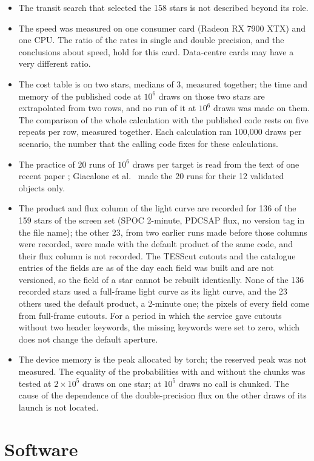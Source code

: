 \documentclass[11pt]{article}
\begin{document}
\begin{itemize}
\item The transit search that selected the 158 stars is not described beyond its role.
\item The speed was measured on one consumer card (Radeon RX 7900 XTX) and one CPU. The ratio of the rates in single and double precision, and the conclusions about speed, hold for this card. Data-centre cards may have a very different ratio.
\item The cost table is on two stars, medians of 3, measured together; the time and memory of the published code at $10^{6}$ draws on those two stars are extrapolated from two rows, and no run of it at $10^{6}$ draws was made on them. The comparison of the whole calculation with the published code rests on five repeats per row, measured together. Each calculation ran 100,000 draws per scenario, the number that the calling code fixes for these calculations.
\item The practice of 20 runs of $10^{6}$ draws per target is read from the text of one recent paper \cite{collier2026}; Giacalone et al.\ \cite{giacalone2021} made the 20 runs for their 12 validated objects only.
\item The product and flux column of the light curve are recorded for 136 of the 159 stars of the screen set (SPOC 2-minute, PDCSAP flux, no version tag in the file name); the other 23, from two earlier runs made before those columns were recorded, were made with the default product of the same code, and their flux column is not recorded. The TESScut cutouts and the catalogue entries of the fields are as of the day each field was built and are not versioned, so the field of a star cannot be rebuilt identically. None of the 136 recorded stars used a full-frame light curve as its light curve, and the 23 others used the default product, a 2-minute one; the pixels of every field come from full-frame cutouts. For a period in which the service gave cutouts without two header keywords, the missing keywords were set to zero, which does not change the default aperture.
\item The device memory is the peak allocated by torch; the reserved peak was not measured. The equality of the probabilities with and without the chunks was tested at $2\times10^{5}$ draws on one star; at $10^{5}$ draws no call is chunked. The cause of the dependence of the double-precision flux on the other draws of its launch is not located.
\end{itemize}


\section*{Software}
\end{document}
